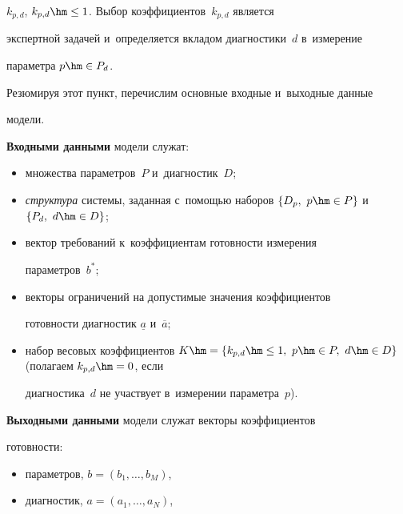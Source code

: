 $k_{p,d}$, $k_{p,d}\hm\leq 1$. Выбор коэффициентов~$k_{p,d}$ является 


экспертной задачей и~определяется вкладом диагностики~$d$ в~измерение 


па\-ра\-мет\-ра $p\hm\in P_d$.





Резюмируя этот пункт, перечислим основные входные и~выходные данные 


модели.





\textbf{Входными данными} модели служат:


\begin{itemize}


\item множества параметров~$P$ и~диагностик~$D$;


\item \textit{структура} системы, заданная с~помощью наборов $\{D_p,\ 


p\hm\in P\}$ и~$\{P_d,\ d\hm\in D\}$;


\item вектор требований к~коэффициентам готовности измерения 


па\-ра\-мет\-ров~$b^*$;


\item векторы ограничений на допустимые значения коэффициентов 


готовности диагностик $\underline{a}$ и~$\overline{a}$;


\item набор весовых коэффициентов $K\hm= \{ k_{p,d}\hm\leq 1, \ 


p\hm\in P,\ d\hm\in D\}$ (полагаем $k_{p,d}\hm=0$, если 


диагностика~$d$ не участвует в~измерении па\-ра\-мет\-ра~$p$).


\end{itemize}





\textbf{Выходными данными} модели служат векторы коэффициентов 


го\-тов\-ности:


\begin{itemize}


\item параметров, $b=(b_1, \ldots , b_M)$,


\item диагностик, $a=(a_1, \ldots , a_N)$,


\end{itemize}


